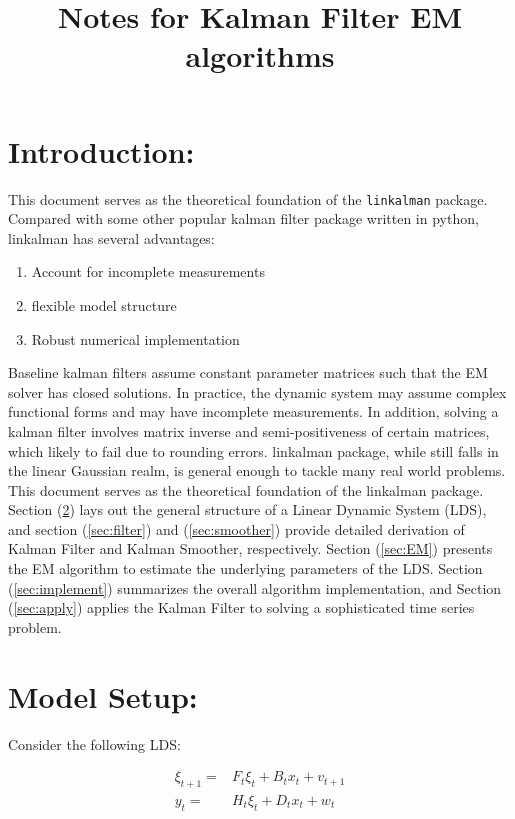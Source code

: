 \documentclass[12pt]{article}
\newenvironment{boenumerate}
    {\begin{enumerate}\renewcommand\labelenumi{\textbf\theenumi}}
    {\end{enumerate}}
\numberwithin{equation}{section}
\begin{document}
\title{Notes for Kalman Filter EM algorithms}

\section{Introduction:}

This document serves as the theoretical foundation of the \texttt{linkalman} package. Compared with some other popular kalman filter package written in python, linkalman has several advantages:

\begin{boenumerate}
    \item Account for incomplete measurements 
    \item flexible model structure
    \item Robust numerical implementation
\end{boenumerate}

Baseline kalman filters assume constant parameter matrices such that the EM solver has closed solutions. In practice, the dynamic system may assume complex functional forms and may have incomplete measurements. In addition, solving a kalman filter involves matrix inverse and semi-positiveness of certain matrices, which likely to fail due to rounding errors. linkalman package, while still falls in the linear Gaussian realm, is general enough to tackle many real world problems. This document serves as the theoretical foundation of the linkalman package. Section (\ref{sec:model_setup}) lays out the general structure of a Linear Dynamic System (LDS), and section (\ref{sec:filter}) and (\ref{sec:smoother}) provide detailed derivation of Kalman Filter and Kalman Smoother, respectively. Section (\ref{sec:EM}) presents the EM algorithm to estimate the underlying parameters of the LDS. Section (\ref{sec:implement}) summarizes the overall algorithm implementation, and Section (\ref{sec:apply}) applies the Kalman Filter to solving a sophisticated time series problem. 

\section{Model Setup:} \label{sec:model_setup}

Consider the following LDS:

\begin{align}
    \xi_{t+1} = & F_{t}\xi_{t} + B_{t}x_t + v_{t+1} \label{eq:state_evolve} \\
    y_t = & H_t\xi_{t} + D_{t}x_t + w_t \label{eq:measure}
\end{align}
\end{document}
